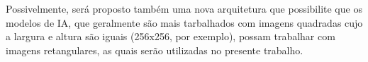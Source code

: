 Possivelmente, será proposto também uma nova arquitetura que possibilite que os modelos de IA, que geralmente são mais tarbalhados com imagens quadradas cujo a largura e altura são iguais (256x256, por exemplo), possam trabalhar com imagens retangulares, as quais serão utilizadas no presente trabalho.








